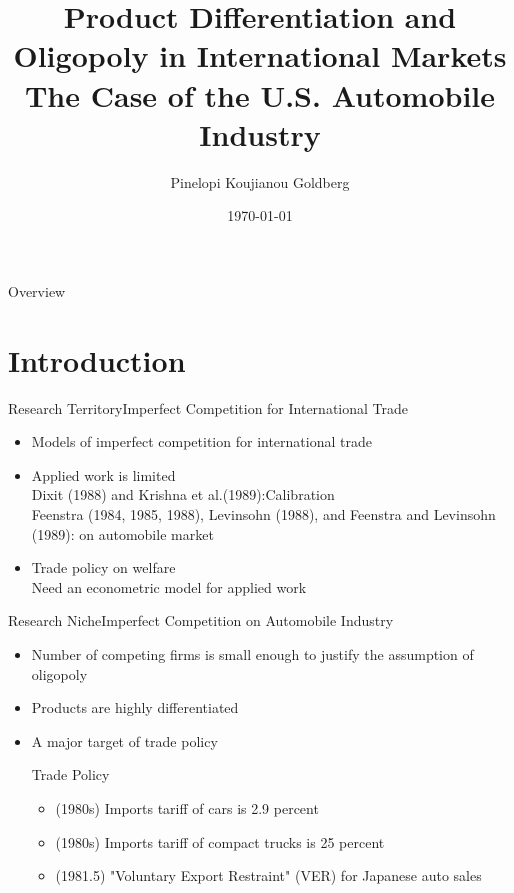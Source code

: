 \documentclass{beamer}
\title[ECTA, 1995]{Product Differentiation and Oligopoly in International Markets \\ {\small The Case of the U.S. Automobile Industry}}
\author{Pinelopi Koujianou Goldberg}
\institute[]{Presenter: Zhuopai Li, Qinzhu Sun, Shiyu Sun}
\date{\today} %
\begin{document}
\begin{frame}
\titlepage
\end{frame}

\begin{frame}{Overview}
\tableofcontents
\end{frame}
\section{Introduction}
\begin{frame}{Research Territory}{Imperfect Competition for International Trade}
	\begin{itemize}
		\item Models of imperfect competition for international trade
		\item Applied work is limited \\
		Dixit (1988) and Krishna et al.(1989):Calibration \\
		Feenstra (1984, 1985, 1988), Levinsohn (1988), and Feenstra and Levinsohn (1989): on automobile market
		\item Trade policy on welfare \\
		Need an econometric model for applied work
	\end{itemize}
\end{frame}
\begin{frame}{Research Niche}{Imperfect Competition on Automobile Industry}
\begin{itemize}
	\item Number of competing firms is small enough to justify the assumption of oligopoly
	\item Products are highly differentiated
	\item A major target of trade policy
	\begin{block}{Trade Policy}
		\begin{itemize}
			\item (1980s) Imports tariff of cars is 2.9 percent
			\item (1980s) Imports tariff of compact trucks is 25 percent
			\item (1981.5) "Voluntary Export Restraint" (VER) for Japanese auto sales
		\end{itemize}
	\end{block}
\end{itemize}
\end{frame}
\end{document}

